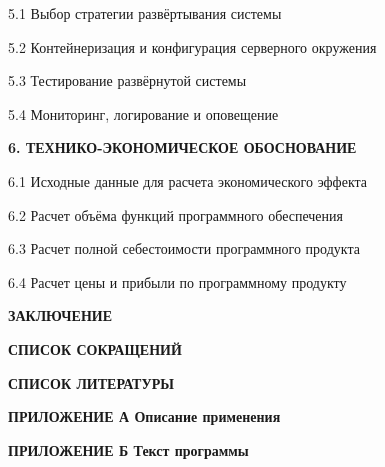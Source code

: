{    \par 5.1 Выбор стратегии развёртывания системы 
    \par 5.2 Контейнеризация и конфигурация серверного окружения 
    \par 5.3 Тестирование развёрнутой системы 
    \par 5.4 Мониторинг, логирование и оповещение 
    \par {\bfseries 6. ТЕХНИКО-ЭКОНОМИЧЕСКОЕ ОБОСНОВАНИЕ }
    \par 6.1 Исходные данные для расчета экономического эффекта 
    \par 6.2 Расчет объёма функций программного обеспечения 
    \par 6.3 Расчет полной себестоимости программного продукта 
    \par 6.4 Расчет цены и прибыли по программному продукту 
    \par {\bfseries ЗАКЛЮЧЕНИЕ }
    \par {\bfseries СПИСОК СОКРАЩЕНИЙ }
    \par {\bfseries СПИСОК ЛИТЕРАТУРЫ }
    \par {\bfseries ПРИЛОЖЕНИЕ А Описание применения}
    \par {\bfseries ПРИЛОЖЕНИЕ Б Текст программы}
    \par 
}
\setcounter{page}{4}
